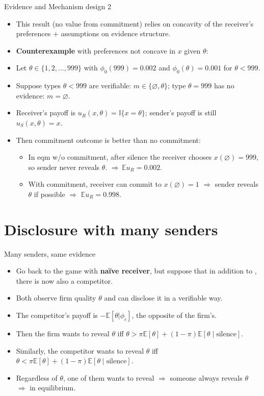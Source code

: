 \documentclass[english,10pt
,aspectratio=169
]{beamer}
\begin{document}
\begin{frame}{Evidence and Mechanism design 2}
\begin{itemize}
	\item This result (no value from commitment) relies on concavity of the receiver's preferences + assumptions on evidence structure. 
	\item \textbf{Counterexample} with preferences not concave in $x$ given $\theta$:
	\item Let $\theta \in \{1,2,...,999\}$ with $\phi_0(999) = 0.002$ and $\phi_0(\theta) = 0.001$ for $\theta < 999$.
	\item Suppose types $\theta<999$ are verifiable: $m \in \{\varnothing, \theta\}$; type $\theta=999$ has no evidence: $m = \varnothing$.
	\item Receiver's payoff is $u_R(x,\theta) = \mathbb{I}\{x=\theta\}$; sender's payoff is still $u_S(x,\theta)=x$.
	\pause \bigskip 
	\item Then commitment outcome is better than no commitment:
	\begin{itemize}
		\item In eqm w/o commitment, after silence the receiver chooses $x(\varnothing)=999$, so sender never reveals $\theta$. $\Rightarrow \, \mathbb{E}u_R = 0.002$.
		\item With commitment, receiver can commit to $x(\varnothing)=1$ $\Rightarrow$ sender reveals $\theta$ if possible $\Rightarrow$ $\mathbb{E}u_R = 0.998$.
	\end{itemize}
\end{itemize}
\end{frame}


\section{Disclosure with many senders}

\begin{frame}{Many senders, same evidence \citep{milgrom_relying_1986}}
\begin{itemize}
	\item Go back to the game with \textbf{na{\"i}ve receiver}, but suppose that in addition to , there is now also \alert{a competitor}.
	\item Both observe firm quality $\theta$ and can disclose it in a verifiable way.
	\item The competitor's payoff is $-\mathbb{E}[\theta|\phi_c]$, the opposite of the firm's.
	
	\pause\bigskip 
	\item Then the firm wants to reveal $\theta$ iff $\theta > \pi \mathbb{E}[\theta] + (1-\pi) \mathbb{E}[\theta \mid \text{silence}]$.
	\item Similarly, the competitor wants to reveal $\theta$ iff $\theta < \pi \mathbb{E}[\theta] + (1-\pi) \mathbb{E}[\theta \mid \text{silence}]$.
	\item Regardless of $\theta$, one of them wants to reveal $\Rightarrow$ someone always reveals $\theta$ \\
	$\Rightarrow$  in equilibrium.
\end{itemize}
\end{frame}
\end{document}
